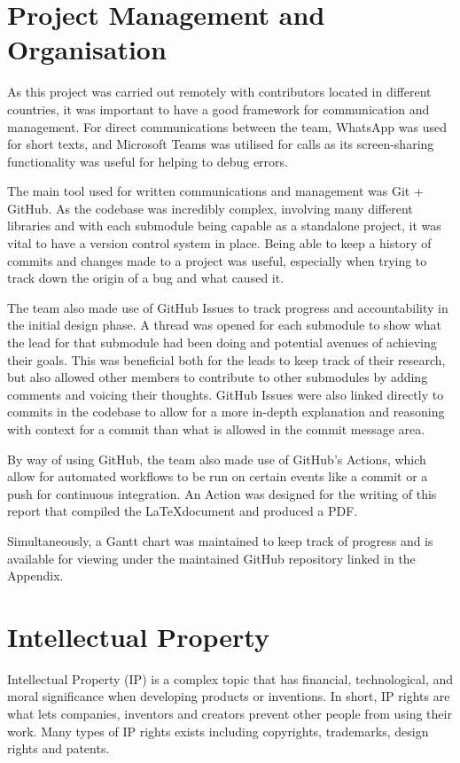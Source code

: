 \documentclass[a4paper]{article}
\begin{document}
\section{Project Management and Organisation}
As this project was carried out remotely
with contributors located in different countries, 
it was important to have a good framework for communication and management. 
For direct communications between the team, WhatsApp was used for short texts, 
and Microsoft Teams was utilised for calls as its screen-sharing functionality 
was useful for helping to debug errors. 

The main tool used for written communications and management was Git + GitHub.
As the codebase was incredibly complex, 
involving many different libraries and with each submodule being capable as a
standalone project, it was vital to have a version control system in place. 
Being able to keep a history of commits and changes made to a project was useful,
especially when trying to track down the origin of a bug and what caused it. 

The team also made use of GitHub Issues to track progress and accountability in 
the initial design phase. A thread was opened for each submodule to show what 
the lead for that submodule had been doing and potential avenues of achieving 
their goals. This was beneficial both for the leads to keep track of their 
research, but also allowed other members to contribute to other submodules 
by adding comments and voicing their thoughts. GitHub Issues were also linked 
directly to commits in the codebase to allow for a more in-depth explanation and
reasoning with context for a commit than what is allowed in the commit message 
area. 

By way of using GitHub, the team also made use of GitHub's Actions, which allow 
for automated workflows to be run on certain events like a commit or a push for 
continuous integration. An Action was designed for the writing of this report
that compiled the \LaTeX document and produced a PDF. 

Simultaneously, a Gantt chart was maintained to keep track of progress and is 
available for viewing under the maintained GitHub repository linked in the Appendix.

\section{Intellectual Property}
Intellectual Property (IP) is a complex topic that has financial, technological, 
and moral significance when developing products or inventions. In short, IP rights are what
lets companies, inventors and creators prevent other people from using their work\cite{perea}.
Many types of IP rights exists including copyrights, trademarks, design rights and patents.  
\end{document}
